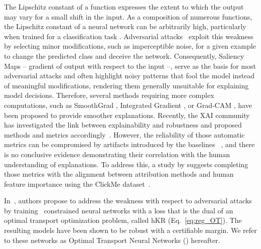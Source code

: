 The Lipschitz constant of a function expresses the extent to which the output may vary for a small shift in the input. As a composition of numerous functions, the Lipschitz constant of a neural network can be arbitrarily high, particularly when trained for a classification task \cite{bethunelip}. Adversarial attacks~\cite{Madry2017} exploit this weakness by selecting minor modifications, such as imperceptible noise, for a given example to change the predicted class and deceive the network. Consequently, Saliency Maps \cite{SimonyanVZ13} -- gradient of output with respect to the input --, serve as the basis for most adversarial attacks and often highlight noisy patterns that fool the model instead of meaningful modifications, rendering them generally unsuitable for explaining model decisions. Therefore, several methods requiring more complex computations, such as SmoothGrad \cite{Smilkov2017}, Integrated Gradient \cite{Sundararajan2017}, or Grad-CAM \cite{Selvaraju_2019}, have been proposed to provide smoother explanations. Recently, the XAI community has investigated the link between explainability and robustness and proposed methods and metrics accordingly~\cite{hsieh2020evaluations, boopathy2020proper, lin2019explanations, ross2021learning}.
However, the reliability of those automatic metrics can be compromised by artifacts introduced by the baselines ~\cite{hsieh2020evaluations,sturmfels2020visualizing,haug2021baselines,kindermans2019reliability,hase2021out}, and there is no conclusive evidence demonstrating their correlation with the human understanding of explanations. To address this, a study by \cite{fel2022aligning} suggests completing those metrics with the alignment between attribution methods and human feature importance using the ClickMe dataset~\cite{linsley2017visual}.

In~\cite{serrurier2021achieving}, authors propose to address the weakness with respect to adversarial attacks by training \onlyonelip~constrained neural networks with a loss that is the dual of an optimal transport optimization problem, called hKR  (Eq.~\ref{eq:reg_OT}). The resulting models have been shown to be robust with a certifiable margin. We refer to these networks as Optimal Transport Neural Networks (\otnn) hereafter.


